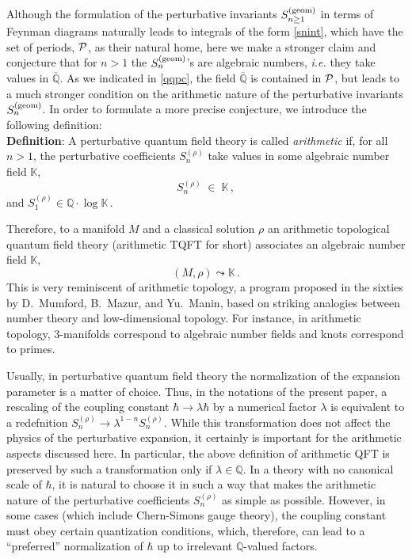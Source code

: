 \documentclass[hyper]{JHEP3}
\def\CP {{\cal P}}
\newcommand\be{\begin{equation}}
\newcommand\ee{\end{equation}}
\begin{document}
Although the formulation of the perturbative invariants $S_{n \ge 1}^{({\rm geom})}$
in terms of Feynman diagrams naturally leads to integrals of the form \eqref{snint},
which have the set of periods, $\CP$, as their natural home,
here we make a stronger claim and conjecture that for $n>1$ the $S_n^{({\rm geom})}$'s are algebraic numbers,
{\it i.e.} they take values in $\overline{\mathbb{Q}}$.
As we indicated in \eqref{qqpc}, the field $\overline{\mathbb{Q}}$ is contained in $\CP$,
but leads to a much stronger condition on the arithmetic nature
of the perturbative invariants $S_n^{({\rm geom})}$.
In order to formulate a more precise conjecture, we introduce the following definition:\\

\noindent \textbf{Definition}: A perturbative quantum field theory
is called {\it arithmetic} if, for all $n>1$,
the perturbative coefficients $S_n^{(\rho)}$ take values in
some algebraic number field $\mathbb{K}$,
\be
S_n^{(\rho)} \;\in\; \mathbb{K}\,,
\ee
and
$S_1^{(\rho)} \in \mathbb{Q} \cdot\log\mathbb{K}\,.$

\bigskip

Therefore, to a manifold $M$ and a classical solution $\rho$
an arithmetic topological quantum field theory (arithmetic TQFT for short)
associates an algebraic number field $\mathbb{K}$,
\be
(M,\rho) \leadsto \mathbb{K}\,.
\ee
This is very reminiscent of arithmetic topology,
a program proposed in the sixties by D.~Mumford, B.~Mazur, and Yu.~Manin,
based on striking analogies between number theory and low-dimensional topology.
For instance, in arithmetic topology, 3-manifolds correspond to
algebraic number fields and knots correspond to primes.

Usually, in perturbative quantum field theory the normalization
of the expansion parameter is a matter of choice.
Thus, in the notations of the present paper, a rescaling of the coupling
constant $\hbar \to \lambda \hbar$ by a numerical factor $\lambda$
is equivalent to a redefnition $S_n^{(\rho)} \to \lambda^{1-n} S_n^{(\rho)}$.
While this transformation does not affect the physics of the perturbative
expansion, it certainly is important for the arithmetic aspects discussed here.
In particular, the above definition of arithmetic QFT is preserved
by such a transformation only if $\lambda \in \mathbb{Q}$.
In a theory with no canonical scale of $\hbar$,
it is natural to choose it in such a way that makes the arithmetic nature
of the perturbative coefficients $S_n^{(\rho)}$ as simple as possible.
However, in some cases (which include Chern-Simons gauge theory),
the coupling constant must obey certain quantization conditions,
which, therefore, can lead to a ``preferred'' normalization of $\hbar$
up to irrelevant $\mathbb{Q}$-valued factors.
\end{document}
